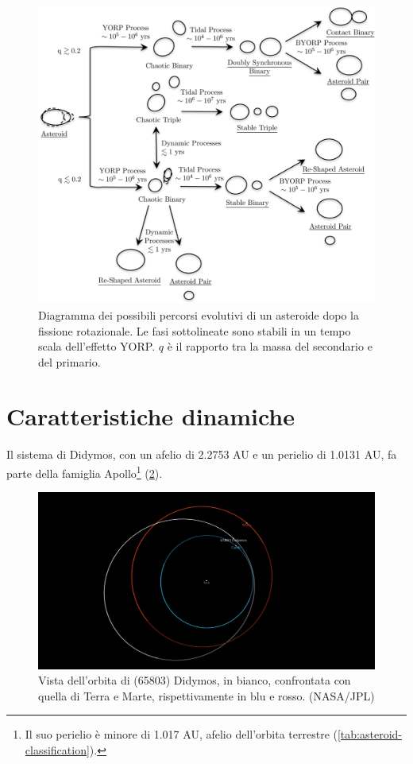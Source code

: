 \documentclass[a4paper,11pt,openright]{book}
\begin{document}
\begin{figure}[!h]
    \centering
    \includegraphics[scale=0.65]{figure/binaries_evolution.jpg}
    \caption[Diagramma dei possibili percorsi evolutivi di un piccolo asteroide.]{Diagramma dei possibili percorsi evolutivi di un asteroide dopo la fissione rotazionale. Le fasi sottolineate sono stabili in un tempo scala dell'effetto YORP. $q$ è il rapporto tra la massa del secondario e del primario. \citep{jacobson_dynamics_2011}}
    \label{fig:binaries_evolution}
\end{figure}

\section{Caratteristiche dinamiche}
Il sistema di Didymos, con un afelio di 2.2753 AU e un perielio di 1.0131 AU, fa parte della famiglia Apollo\footnote{Il suo perielio è minore di 1.017 AU, afelio dell'orbita terrestre (\cref{tab:asteroid-classification}).} (\cref{fig:orbit_view}).

\begin{figure}[!h]
    \centering
    \includegraphics[scale=0.18]{figure/orbit_viewer.jpg}
    \caption[Vista dell'orbita di (65803) Didymos.]{Vista dell'orbita di (65803) Didymos, in bianco, confrontata con quella di Terra e Marte, rispettivamente in blu e rosso. (NASA/JPL)}
    \label{fig:orbit_view}
\end{figure}
\end{document}
